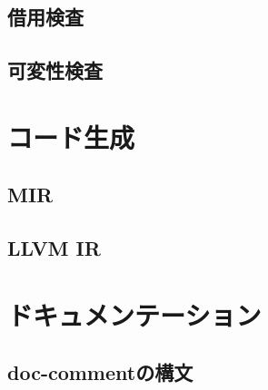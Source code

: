 \documentclass[dvipdfmx,uplatex,papersize,a4paper,10pt]{jsbook}
\theoremstyle{definition}
\begin{document}
\section{借用検査}

\section{可変性検査}



\chapter{コード生成}

\section{MIR}

\section{LLVM IR}



\chapter{ドキュメンテーション}

\section{doc-commentの構文}





\end{document}
